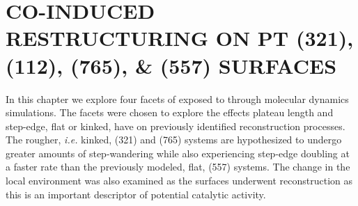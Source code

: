 \chapter{CO-INDUCED RESTRUCTURING ON PT (321), (112), (765), \& (557) SURFACES}



In this chapter we explore four facets of  exposed to  through
molecular dynamics simulations. The facets were chosen to explore the effects
plateau length and step-edge, flat or kinked, have on previously identified
reconstruction processes. The rougher, {\em i.e.} kinked, (321) and (765)
systems are hypothesized to undergo greater amounts of step-wandering while
also experiencing step-edge doubling at a faster rate than the previously
modeled, flat, (557) systems. The change in the local environment was also
examined as the surfaces underwent reconstruction as this is an important
descriptor of potential catalytic activity. 

